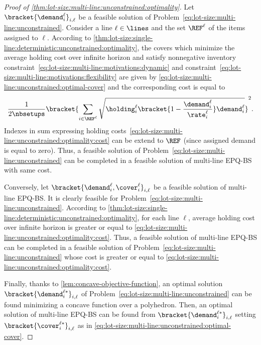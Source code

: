 \begin{proof}[Proof of \cref{thm:lot-size:multi-line:unconstrained:optimality}]
Let $\bracket{\demand_i^{\ell}}_{i,\ell}$ be a feasible solution of Problem~\eqref{eq:lot-size:multi-line:unconstrained}.
Consider a line $\ell\in\lines$ and the set $\REF^{\ell}$ of the items assigned to $\ell$.
According to \cref{thm:lot-size:single-line:deterministic:unconstrained:optimality}, the covers which minimize the average holding cost over infinite horizon and satisfy nonnegative inventory constraint~\eqref{eq:lot-size:multi-line:motivations:dynamic} and constraint~\eqref{eq:lot-size:multi-line:motivations:flexibility} are given by \cref{eq:lot-size:multi-line:unconstrained:optimal-cover} and the corresponding cost is equal to
\begin{equation}\label{eq:lot-size:multi-line:unconstrained:optimality:cost}
  \frac{1}{2\nbsetups}\bracket{\sum_{i\in\REF^{\ell}}\sqrt{\holding_i^{\ell}\bracket{1-\frac{\demand_i^{\ell}}{\rate_i^{\ell}}}\demand_i^{\ell}}}^2.
\end{equation}
Indexes in sum expressing holding costs~\eqref{eq:lot-size:multi-line:unconstrained:optimality:cost} can be extend to $\REF$ (since assigned demand is equal to zero).
Thus, a feasible solution of Problem~\eqref{eq:lot-size:multi-line:unconstrained} can be completed in a feasible solution of multi-line EPQ-BS with same cost.


Conversely, let $\bracket{\demand_i^{\ell},\cover_i^{\ell}}_{i,\ell}$ be a feasible solution of multi-line EPQ-BS.
It is clearly feasible for Problem~\eqref{eq:lot-size:multi-line:unconstrained}.
According to \cref{thm:lot-size:single-line:deterministic:unconstrained:optimality}, for each line $\ell$, average holding cost over infinite horizon is greater or equal to \eqref{eq:lot-size:multi-line:unconstrained:optimality:cost}.
Thus, a feasible solution of multi-line EPQ-BS can be completed in a feasible solution of Problem~\eqref{eq:lot-size:multi-line:unconstrained} whose cost is greater or equal to \eqref{eq:lot-size:multi-line:unconstrained:optimality:cost}.


Finally, thanks to \cref{lem:concave-objective-function}, an optimal solution $\bracket{\demand_i^{\ell*}}_{i,\ell}$ of Problem~\eqref{eq:lot-size:multi-line:unconstrained} can be found minimizing a concave function over a polyhedron.
Then, an optimal solution of multi-line EPQ-BS can be found from $\bracket{\demand_i^{\ell*}}_{i,\ell}$ setting $\bracket{\cover_i^{\ell*}}_{i,\ell}$ as in \cref{eq:lot-size:multi-line:unconstrained:optimal-cover}.
\end{proof}

